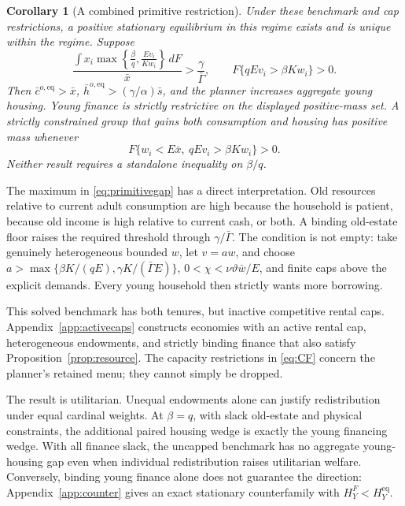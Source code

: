 \documentclass[11pt]{article}
\newtheorem{corollary}{Corollary}
\newcommand{\dd}{\,d}
\newcommand{\eq}{\mathrm{eq}}
\newcommand{\tht}{\vartheta}
\begin{document}
\begin{corollary}[A combined primitive restriction]\label{cor:primitive}
Under these benchmark and cap restrictions, a positive stationary equilibrium in this regime exists and is unique within the regime. Suppose
\begin{equation}
 \frac{\displaystyle\int x_i
       \max\left\{\frac\beta q,\frac{Ev_i}{Kw_i}\right\}\dd F}{\bar x}
       >\frac\gamma{\bar\Gamma},\qquad
 F\{qEv_i>\beta Kw_i\}>0.\label{eq:primitivegap}
\end{equation}
Then $\bar c^{o,\eq}>\bar x$, $\bar h^{o,\eq}>(\gamma/\alpha)\bar s$, and the planner increases aggregate young housing. Young finance is strictly restrictive on the displayed positive-mass set. A strictly constrained group that gains both consumption and housing has positive mass whenever
\begin{equation}
 F\{w_i<E\bar x,\ qEv_i>\beta Kw_i\}>0.\label{eq:recipientgroup}
\end{equation}
Neither result requires a standalone inequality on $\beta/q$.
\end{corollary}

The maximum in \eqref{eq:primitivegap} has a direct interpretation. Old resources relative to current adult consumption are high because the household is patient, because old income is high relative to current cash, or both. A binding old-estate floor raises the required threshold through $\gamma/\bar\Gamma$. The condition is not empty: take genuinely heterogeneous bounded $w$, let $v=aw$, and choose
$a>\max\{\beta K/(qE),\gamma K/(\bar\Gamma E)\}$, $0<\chi<\nu\tht\bar w/E$, and finite caps above the explicit demands. Every young household then strictly wants more borrowing.

This solved benchmark has both tenures, but inactive competitive rental caps. Appendix~\ref{app:activecaps} constructs economies with an active rental cap, heterogeneous endowments, and strictly binding finance that also satisfy Proposition~\ref{prop:resource}. The capacity restrictions in \eqref{eq:CF} concern the planner's retained menu; they cannot simply be dropped.

The result is utilitarian. Unequal endowments alone can justify redistribution under equal cardinal weights. At $\beta=q$, with slack old-estate and physical constraints, the additional paired housing wedge is exactly the young financing wedge. With all finance slack, the uncapped benchmark has no aggregate young-housing gap even when individual redistribution raises utilitarian welfare. Conversely, binding young finance alone does not guarantee the direction: Appendix~\ref{app:counter} gives an exact stationary counterfamily with $H_Y^F<H_Y^{\eq}$.
\end{document}

